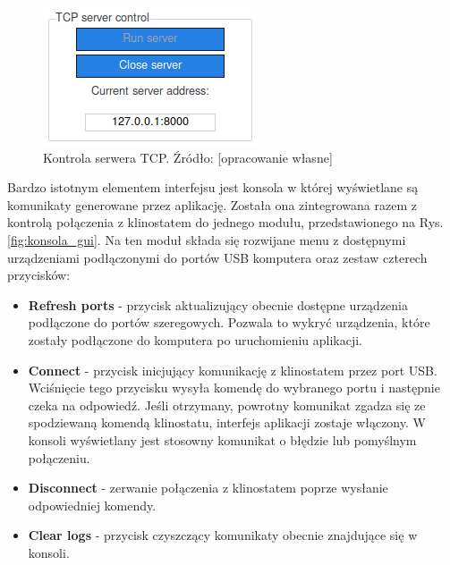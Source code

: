 \begin{figure}[h]
	
	\centering
	\includegraphics[scale=2]{serwer}
	\caption{Kontrola serwera TCP. Źródło: [opracowanie własne]} 
	\label{fig:tcp_gui}
	
\end{figure}

Bardzo istotnym elementem interfejsu jest konsola w której wyświetlane są komunikaty generowane przez aplikację. Została ona zintegrowana razem z kontrolą połączenia z klinostatem do jednego modułu, przedstawionego na Rys. \ref{fig:konsola_gui}. Na ten moduł składa się rozwijane menu z dostępnymi urządzeniami podłączonymi do portów USB komputera oraz zestaw czterech przycisków:
\begin{itemize}
	\item \textbf{Refresh ports} - przycisk aktualizujący obecnie dostępne urządzenia podłączone do portów szeregowych. Pozwala to wykryć urządzenia, które zostały podłączone do komputera po uruchomieniu aplikacji.
	\item \textbf{Connect} - przycisk inicjujący komunikację z klinostatem przez port USB. Wciśnięcie tego przycisku wysyła komendę do wybranego portu i następnie czeka na odpowiedź. Jeśli otrzymany, powrotny komunikat zgadza się ze spodziewaną komendą klinostatu, interfejs aplikacji zostaje włączony. W konsoli wyświetlany jest stosowny komunikat o błędzie lub pomyślnym połączeniu.
	\item \textbf{Disconnect} - zerwanie połączenia z klinostatem poprze wysłanie odpowiedniej komendy.
	\item \textbf{Clear logs} - przycisk czyszczący komunikaty obecnie znajdujące się w konsoli.
	
\end{itemize}

